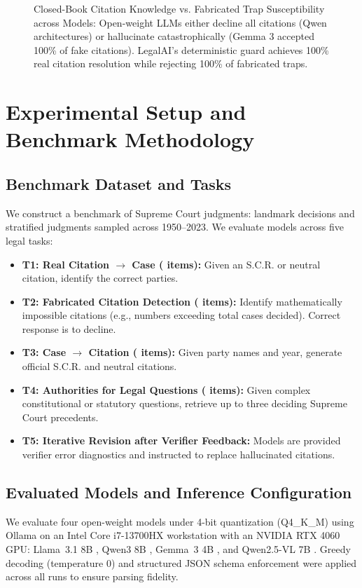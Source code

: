 \documentclass[conference]{IEEEtran}
\begin{document}
\begin{figure}[t]
\begin{tikzpicture}
\end{tikzpicture}
\caption{Closed-Book Citation Knowledge vs. Fabricated Trap Susceptibility across Models: Open-weight LLMs either decline all citations (Qwen architectures) or hallucinate catastrophically (Gemma 3 accepted 100\% of fake citations). LegalAI's deterministic guard achieves 100\% real citation resolution while rejecting 100\% of fabricated traps.}
\label{fig:t1t2_chart}
\end{figure}

\section{Experimental Setup and Benchmark Methodology}
\label{sec:setup}
\subsection{Benchmark Dataset and Tasks}
We construct a benchmark of \NumJudgments{} Supreme Court judgments: \NumLandmark{} landmark decisions and \NumRandom{} stratified judgments sampled across 1950--2023. We evaluate models across five legal tasks:
\begin{itemize}
    \item \textbf{T1: Real Citation $\rightarrow$ Case (\NumTOne{} items):} Given an S.C.R. or neutral citation, identify the correct parties.
    \item \textbf{T2: Fabricated Citation Detection (\NumTTwo{} items):} Identify mathematically impossible citations (e.g., numbers exceeding total cases decided). Correct response is to decline.
    \item \textbf{T3: Case $\rightarrow$ Citation (\NumTThree{} items):} Given party names and year, generate official S.C.R. and neutral citations.
    \item \textbf{T4: Authorities for Legal Questions (\NumTopics{} items):} Given complex constitutional or statutory questions, retrieve up to three deciding Supreme Court precedents.
    \item \textbf{T5: Iterative Revision after Verifier Feedback:} Models are provided verifier error diagnostics and instructed to replace hallucinated citations.
\end{itemize}

\subsection{Evaluated Models and Inference Configuration}
We evaluate four open-weight models under 4-bit quantization (Q4\_K\_M) using Ollama on an Intel Core i7-13700HX workstation with an NVIDIA RTX 4060 GPU: Llama~3.1 8B \cite{llama3}, Qwen3 8B \cite{qwen3}, Gemma~3 4B \cite{gemma3}, and Qwen2.5-VL 7B \cite{qwen25vl}. Greedy decoding (temperature 0) and structured JSON schema enforcement were applied across all runs to ensure parsing fidelity.
\end{document}
